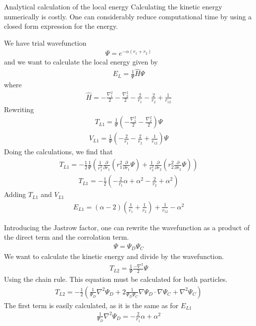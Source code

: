 \documentclass[a4paper, 12pt, titlepage]{article}
\begin{document}
 \begin{section}{Analytical calculation of the local energy}
 Calculating the kinetic energy numerically is costly. One can considerably reduce computational time by using a closed form expression for the energy. 

 We have trial wavefunction 
 \begin{align*}
 	\Psi = e^{-\alpha(r_1 + r_2)}
 \end{align*}
 and we want to calculate the local energy given by
 \begin{align*}
 	E_L = \frac{1}{\Psi} \hat H \Psi
 \end{align*}
 where
 \begin{align*}
 	\hat H = -\frac{\nabla_1^2}{2} - \frac{\nabla_2^2}{2} - \frac{2}{r_1} - \frac{2}{r_2} + \frac{1}{r_{12}}
 \end{align*}
 Rewriting	
 \begin{align*}
 	T_{L1} = \frac{1}{\Psi} \left( -\frac{\nabla_1^2}{2} - \frac{\nabla_2^2}{2} \right) \Psi
 \end{align*}
 \begin{align*}
 	V_{L1} = \frac{1}{\Psi} \left( - \frac{2}{r_1} - \frac{2}{r_2} + \frac{1}{r_{12}} \right) \Psi
 \end{align*}
 Doing the calculations, we find that
 \begin{align*}
 	T_{L1} = -\frac{1}{2} \frac{1}{\Psi} \left( \frac{1}{r_1^2} \frac{\partial}{\partial r_1} \left( r_1^2 \frac{\partial}{\partial r_1} \Psi \right) + \frac{1}{r_2^2} \frac{\partial}{\partial r_2} \left( r_2^2 \frac{\partial}{\partial r_2} \Psi \right) \right)
 \end{align*}
 \begin{align*}
 	T_{L1} = -\frac{1}{2} \left( -\frac{2}{r_1}\alpha + \alpha^2 - \frac{2}{r_2} + \alpha^2 \right)
 \end{align*}
 Adding $T_{L1}$ and $V_{L1}$ 
 \begin{align*}
 	E_{L1} = \left( \alpha - 2 \right) \left( \frac{1}{r_1} + \frac{1}{r_2} \right) + \frac{1}{r_{12}} - \alpha^2 
 \end{align*}

 Introducing the Jastrow factor, one can rewrite the wavefunction
 as a product of the direct term and the corrolation term. 
 \begin{align*}
 	\Psi = \Psi_D \Psi_C
 \end{align*}
 We want to calculate the kinetic energy and divide by the wavefunction.
 \begin{align*}
 	T_{L2} = \frac{1}{\Psi} \frac{-\nabla^2}{2} \Psi
 \end{align*}
 Using the chain rule. This equation must be calculated for both particles. 
 \begin{align}
 	T_{L2} = -\frac{1}{2} \left( \frac{1}{\Psi_D}\nabla^2 \Psi_D + 2 \frac{1}{\Psi_D \Psi_C} \nabla \Psi_D \cdot \nabla \Psi_C + \nabla^2 \Psi_C \right)
 	\label{T_L2}
 \end{align}
 The first term is easily calculated, as it is the same as for $E_{L1}$
 \begin{align*}
 	\frac{1}{\Psi_D}\nabla^2 \Psi_D =  -\frac{2}{r_1}\alpha + \alpha^2 
 \end{align*}


\end{section}
\end{document}
